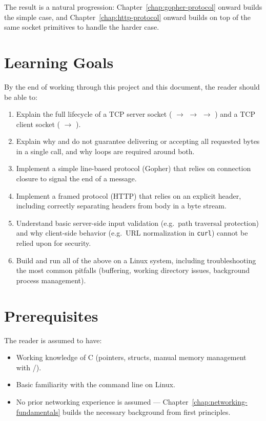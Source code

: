 The result is a natural progression: Chapter~\ref{chap:gopher-protocol} onward builds the simple case, and Chapter~\ref{chap:http-protocol} onward builds on top of the same socket primitives to handle the harder case.

\section{Learning Goals}

By the end of working through this project and this document, the reader should be able to:

\begin{enumerate}
    \item Explain the full lifecycle of a TCP server socket ( $\to$  $\to$  $\to$ ) and a TCP client socket ( $\to$ ).
    \item Explain why  and  do not guarantee delivering or accepting all requested bytes in a single call, and why loops are required around both.
    \item Implement a simple line-based protocol (Gopher) that relies on connection closure to signal the end of a message.
    \item Implement a framed protocol (HTTP) that relies on an explicit  header, including correctly separating headers from body in a byte stream.
    \item Understand basic server-side input validation (e.g.\ path traversal protection) and why client-side behavior (e.g.\ URL normalization in \texttt{curl}) cannot be relied upon for security.
    \item Build and run all of the above on a Linux system, including troubleshooting the most common pitfalls (buffering, working directory issues, background process management).
\end{enumerate}

\section{Prerequisites}

The reader is assumed to have:
\begin{itemize}
    \item Working knowledge of C (pointers, structs, manual memory management with /).
    \item Basic familiarity with the command line on Linux.
    \item No prior networking experience is assumed --- Chapter~\ref{chap:networking-fundamentals} builds the necessary background from first principles.
\end{itemize}

